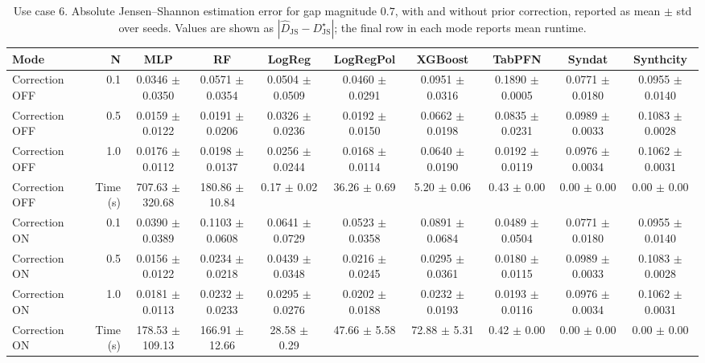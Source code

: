 \begin{table}[ht]
\centering
\scriptsize
\setlength{\tabcolsep}{2.5pt}
\caption{Use case 6. Absolute Jensen--Shannon estimation error for gap magnitude $0.7$, with and without prior correction, reported as mean $\pm$ std over seeds. Values are shown as $|\widehat{D}_{\mathrm{JS}} - D_{\mathrm{JS}}^{\star}|$; the final row in each mode reports mean runtime.}
\label{tab:uc6_gap_0p7_on_off_mean_std_from_seeds}
\begin{tabular}{lrcccccccc}
\toprule
Mode & N & MLP & RF & LogReg & LogRegPol & XGBoost & TabPFN & Syndat & Synthcity \\
\midrule
Correction OFF & 0.1 & 0.0346 $\pm$ 0.0350 & 0.0571 $\pm$ 0.0354 & 0.0504 $\pm$ 0.0509 & 0.0460 $\pm$ 0.0291 & 0.0951 $\pm$ 0.0316 & 0.1890 $\pm$ 0.0005 & 0.0771 $\pm$ 0.0180 & 0.0955 $\pm$ 0.0140 \\
Correction OFF & 0.5 & 0.0159 $\pm$ 0.0122 & 0.0191 $\pm$ 0.0206 & 0.0326 $\pm$ 0.0236 & 0.0192 $\pm$ 0.0150 & 0.0662 $\pm$ 0.0198 & 0.0835 $\pm$ 0.0231 & 0.0989 $\pm$ 0.0033 & 0.1083 $\pm$ 0.0028 \\
Correction OFF & 1.0 & 0.0176 $\pm$ 0.0112 & 0.0198 $\pm$ 0.0137 & 0.0256 $\pm$ 0.0244 & 0.0168 $\pm$ 0.0114 & 0.0640 $\pm$ 0.0190 & 0.0192 $\pm$ 0.0119 & 0.0976 $\pm$ 0.0034 & 0.1062 $\pm$ 0.0031 \\
Correction OFF & Time (s) & 707.63 $\pm$ 320.68 & 180.86 $\pm$ 10.84 & 0.17 $\pm$ 0.02 & 36.26 $\pm$ 0.69 & 5.20 $\pm$ 0.06 & 0.43 $\pm$ 0.00 & 0.00 $\pm$ 0.00 & 0.00 $\pm$ 0.00 \\
Correction ON & 0.1 & 0.0390 $\pm$ 0.0389 & 0.1103 $\pm$ 0.0608 & 0.0641 $\pm$ 0.0729 & 0.0523 $\pm$ 0.0358 & 0.0891 $\pm$ 0.0684 & 0.0489 $\pm$ 0.0504 & 0.0771 $\pm$ 0.0180 & 0.0955 $\pm$ 0.0140 \\
Correction ON & 0.5 & 0.0156 $\pm$ 0.0122 & 0.0234 $\pm$ 0.0218 & 0.0439 $\pm$ 0.0348 & 0.0216 $\pm$ 0.0245 & 0.0295 $\pm$ 0.0361 & 0.0180 $\pm$ 0.0115 & 0.0989 $\pm$ 0.0033 & 0.1083 $\pm$ 0.0028 \\
Correction ON & 1.0 & 0.0181 $\pm$ 0.0113 & 0.0232 $\pm$ 0.0233 & 0.0295 $\pm$ 0.0276 & 0.0202 $\pm$ 0.0188 & 0.0232 $\pm$ 0.0193 & 0.0193 $\pm$ 0.0116 & 0.0976 $\pm$ 0.0034 & 0.1062 $\pm$ 0.0031 \\
Correction ON & Time (s) & 178.53 $\pm$ 109.13 & 166.91 $\pm$ 12.66 & 28.58 $\pm$ 0.29 & 47.66 $\pm$ 5.58 & 72.88 $\pm$ 5.31 & 0.42 $\pm$ 0.00 & 0.00 $\pm$ 0.00 & 0.00 $\pm$ 0.00 \\
\bottomrule
\end{tabular}
\end{table}